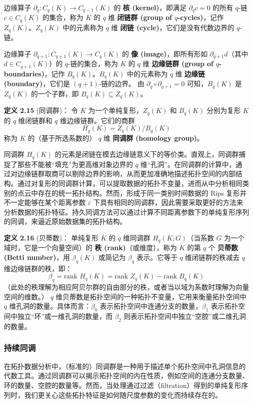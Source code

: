 边缘算子 $\partial_q: C_q(K) \to C_{q-1}(K)$ 的 \textbf{核 (kernel)}，即满足 $\partial_q c = 0$ 的所有 $q$-链 $c \in C_q(K)$ 的集合，称为 $K$ 的 $q$ 维 \textbf{闭链群 (group of $q$-cycles)}，记作 $Z_q(K)$。$Z_q(K)$ 中的元素称为 $q$ 维 \textbf{闭链 (cycle)}，它们是没有代数边界的 $q$-链。

边缘算子 $\partial_{q+1}: C_{q+1}(K) \to C_q(K)$ 的 \textbf{像 (image)}，即所有形如 $\partial_{q+1} d$（其中 $d \in C_{q+1}(K)$）的 $q$-链的集合，称为 $K$ 的 $q$ 维 \textbf{边缘链群 (group of $q$-boundaries)}，记作 $B_q(K)$。$B_q(K)$ 中的元素称为 $q$ 维 \textbf{边缘链 (boundary)}，它们是 $(q+1)$-链的边界。
由 $\partial_q \circ \partial_{q+1} = 0$ 可知，$B_q(K)$ 是 $Z_q(K)$ 的一个子群，即 $B_q(K) \subseteq Z_q(K)$。

\textbf{定义 2.15} (同调群)\cite{armstrong2013basic}：
令 $K$ 为一个单纯复形，$Z_q(K)$ 和 $B_q(K)$ 分别为复形 $K$ 的 $q$ 维闭链群和 $q$ 维边缘链群。它们的商群
$$ H_q(K) = Z_q(K) / B_q(K) $$
称为 $K$ 的（基于所选系数的） $q$ 维 \textbf{同调群 (homology group)}。

同调群 $H_q(K)$ 的元素是闭链在模去边缘链意义下的等价类。直观上，同调群捕捉了那些不能被“填充”为更高维对象边界的 $q$ 维“孔洞”。在同调群的计算中，通过对边缘链群取商可以剔除边界的影响，从而更加准确地描述拓扑空间的内部结构。通过对复形的同调群计算，可以提取数据的拓扑不变量，进而从中分析相同类别的点云中存在的统一拓扑结构。然而，形成于同一类别时间数据的 Rips 复形并不一定能够在某个距离参数 $\varepsilon$ 下具有相同的同调群，因此需要采取更好的方法来分析数据的拓扑特征。持久同调方法可以通过计算不同距离参数下的单纯复形序列的同调，来逼近原始数据集的拓扑结构。

\textbf{定义 2.16} (贝蒂数)\cite{armstrong2013basic}：
单纯复形 $K$ 的 $q$ 维同调群 $H_q(K; G)$（当系数 $G$ 为一个域时，它是一个向量空间）的 \textbf{秩 (rank)}（或维度），称为 $K$ 的第 $q$ 个 \textbf{贝蒂数 (Betti number)}，用 $\beta_q(K)$ 或简记为 $\beta_q$ 表示。它等于 $q$ 维闭链群的秩减去 $q$ 维边缘链群的秩，即：
$$ \beta_q = \text{rank } H_q(K) = \text{rank } Z_q(K) - \text{rank } B_q(K) $$
（此处的秩理解为相应阿贝尔群的自由部分的秩，或者当以域为系数时理解为向量空间的维数。）
$q$ 维贝蒂数是拓扑空间的一种拓扑不变量，它用来衡量拓扑空间中 $q$ 维孔洞的数量。具体而言：$\beta_0$ 表示拓扑空间中连通分支的数量，$\beta_1$ 表示拓扑空间中独立“环”或一维孔洞的数量，而 $\beta_2$ 则表示拓扑空间中独立“空腔”或二维孔洞的数量。

\subsubsection{持续同调}
在拓扑数据分析中，（标准的）同调群是一种用于描述单个拓扑空间中孔洞信息的代数工具。通过同调群可以揭示拓扑空间的内在性质，例如空间的连通分支数量、环的数量、空腔的数量等。然而，当处理通过过滤（filtration）得到的单纯复形序列时，我们更关心这些拓扑特征是如何随尺度参数的变化而持续存在的。


